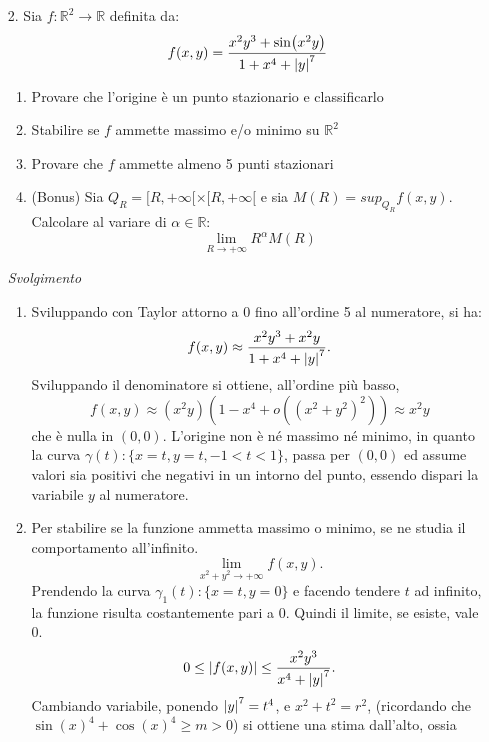 \documentclass[a4paper]{article}
\begin{document}
\begin{itemize}
 \item[2.] Sia $f : \mathbb{R}^{2} \rightarrow \mathbb{R}$ definita da:
\begin{equation*}
f(x,y)=\frac{x^{2}y^{3} + \sin(x^{2}y)}{1 + x^{4} + \abs{y}^{7}}
\end{equation*}
\begin{enumerate}[label=(\alph*)]
\item Provare che l'origine è un punto stazionario e classificarlo
\item Stabilire se $f$ ammette massimo e/o minimo su $\mathbb{R}^{2}$
\item Provare che $f$ ammette almeno 5 punti stazionari
\item (Bonus) Sia $Q_{R}=[R,+\infty[\times[R,+\infty[$ e sia $M(R)=sup_{Q_{R}} f(x,y)$. Calcolare al variare di $\alpha \in \mathbb{R}$:
\begin{equation*}
\lim_{R\to +\infty} R^{\alpha} M(R)
\end{equation*} 
\end{enumerate}
\emph{Svolgimento}
\begin{enumerate}[label=(\alph*)]
\item Sviluppando con Taylor attorno a 0 fino all'ordine 5 al numeratore, si ha:
\begin{equation}
f(x,y)\approx \frac{x^{2}y^{3} + x^{2}y}{1 + x^{4} + \abs{y}^{7}}.
\end{equation}
Sviluppando il denominatore si ottiene, all'ordine più basso,
\begin{equation}
f(x,y)\approx (x^{2}y)(1 - x^{4} + o((x^{2}+y^{2})^{2}))\approx x^{2}y
\end{equation}
che è nulla in $(0,0)$. L'origine non è né massimo né minimo, in quanto la curva $\gamma(t):\{x=t, y=t, -1<t<1\}$, passa per $(0,0)$ ed assume valori sia positivi che negativi in un intorno del punto, essendo dispari la variabile $y$ al numeratore.
\item Per stabilire se la funzione ammetta massimo o minimo, se ne studia il comportamento all'infinito.
\begin{equation}
\lim_{x^2+y^2\to+\infty} f(x,y).
\end{equation}
Prendendo la curva $\gamma_{1}(t):\{x=t, y=0\}$ e facendo tendere $t$ ad infinito, la funzione risulta costantemente pari a 0. Quindi il limite, se esiste, vale 0.
\begin{equation}
0 \leq \abs{f(x,y)} \leq \frac{x^{2}y^{3}}{x^{4}+ \abs{y}^{7}}.
\end{equation}
Cambiando variabile, ponendo $\abs{y}^{7}=t^{4}$, e $x^{2} + t^{2} = r^{2}$, (ricordando che $\sin(x)^{4} + \cos(x)^{4} \geq m >0$) si ottiene una stima dall'alto, ossia

\end{enumerate}
\end{itemize}
\end{document}
